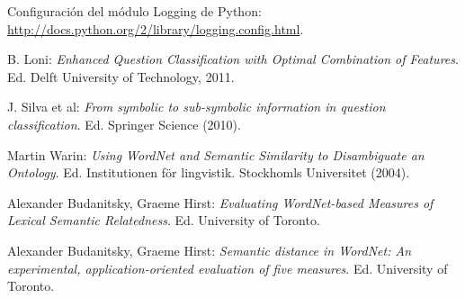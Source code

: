 \documentclass[12pt,a4paper,titlepage]{article}
\begin{document}
\begin{thebibliography}{9}
Configuración del módulo Logging de Python: \url{http://docs.python.org/2/library/logging.config.html}.

B. Loni: \emph{Enhanced Question Classification with Optimal Combination of Features}. Ed. Delft University of Technology, 2011.

J. Silva et al: \emph{From symbolic to sub-symbolic information in question classification}. Ed. Springer Science (2010).

Martin Warin: \emph{Using WordNet and Semantic Similarity to Disambiguate an Ontology}. Ed. Institutionen för lingvistik. Stockhomls Universitet (2004).

Alexander Budanitsky, Graeme Hirst: \emph{Evaluating WordNet-based Measures of Lexical Semantic Relatedness}. Ed. University of Toronto.

Alexander Budanitsky, Graeme Hirst: \emph{Semantic distance in WordNet: An experimental, application-oriented evaluation of five measures}. Ed. University of Toronto.

\end{thebibliography}
\end{document}
